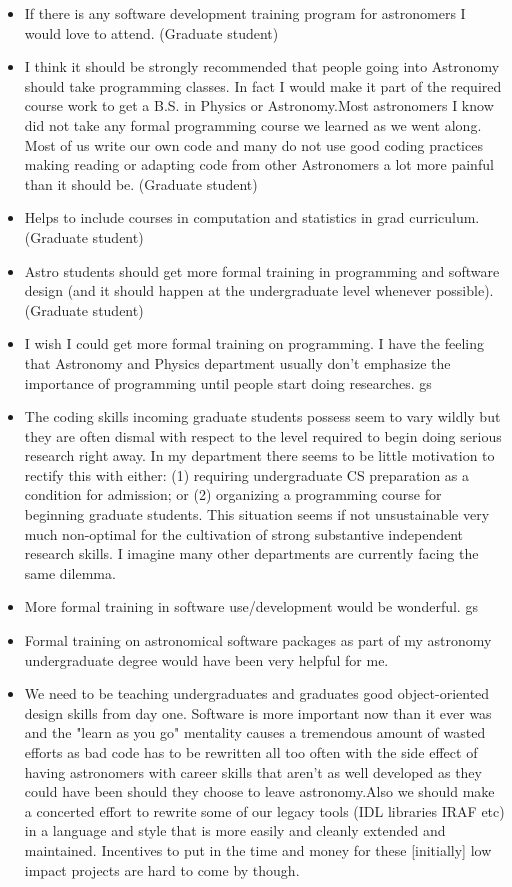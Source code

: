 \begin{itemize}
\item{If there is any software development training program for astronomers I would love to attend. (Graduate student)}
\item{I think it should be strongly recommended that people going into Astronomy should take programming classes. In fact I would make it part of the required course work to get a B.S. in Physics or Astronomy.Most astronomers I know did not take any formal programming course we learned as we went along. Most of us write our own code and many do not use good coding practices making reading or adapting code from other Astronomers a lot more painful than it should be. (Graduate student)}
\item{Helps to include courses in computation and statistics in grad curriculum. (Graduate student)}
\item{Astro students should get more formal training in programming and software design (and it should happen at the undergraduate level whenever possible). (Graduate student)}
\item{I wish I could get more formal training on programming. I have the feeling that Astronomy and Physics department usually don't emphasize the importance of programming until people start doing researches. gs}
\item{The coding skills incoming graduate students possess seem to vary wildly but they are often dismal with respect to the level required to begin doing serious research right away. In my department there seems to be little motivation to rectify this with either: (1) requiring undergraduate CS preparation as a condition for admission; or (2) organizing a programming course for beginning graduate students. This situation seems if not unsustainable very much non-optimal for the cultivation of strong substantive independent research skills. I imagine many other departments are currently facing the same dilemma.}
\item{More formal training in software use/development would be wonderful. gs}
\item{Formal training on astronomical software packages as part of my astronomy undergraduate degree would have been very helpful for me.}
\item{We need to be teaching undergraduates and graduates good object-oriented design skills from day one. Software is more important now than it ever was and the "learn as you go" mentality causes a tremendous amount of wasted efforts as bad code has to be rewritten all too often with the side effect of having astronomers with career skills that aren't as well developed as they could have been should they choose to leave astronomy.Also we should make a concerted effort to rewrite some of our legacy tools (IDL libraries IRAF etc) in a language and style that is more easily and cleanly extended and maintained. Incentives to put in the time and money for these [initially] low impact projects are hard to come by though.}

\end{itemize}

